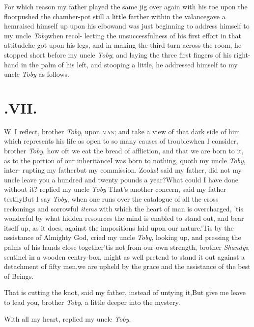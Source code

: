 \documentclass{article}
\begin{document}
For which reason my father played the same jig over again with
his toe upon the floor\tsh pushed the chamber-pot still a
little farther within the valance\tsk gave a hem\tsk raised
himself up upon his elbow\tsk and was just beginning to address
himself to my uncle \textit{Toby}\tsk when recol-
lecting the unsuccessfulness of his first effort in that
attitude\tsk he got upon his legs, and in making the third
turn across the room, he stopped short before my uncle
\textit{Toby}; and laying the three first fingers of his
right-hand in the palm of his left, and stooping a little,
he addressed himself to my uncle \textit{Toby} as follows.

\bigskip
\section{.\enspace VII.}

\lettrine{W}{\,} I reflect, brother \textit{Toby},\break
upon \textsc{man}; and take a view of\break
that dark side of him which represents his life as open to
so many causes of trouble\tsk when I consider, brother
\textit{Toby}, how oft we eat the bread of affliction, and
that we are born to it, as to the portion of our
inheritance\tsk I was born to nothing, quoth my uncle
\textit{Toby}, inter-
rupting my father\tsk but my commission.
Zooks! said my father, did not my uncle leave you a hundred
and twenty pounds a year?\tsh What could I have done without
it? replied my uncle \textit{Toby} \tsh That’s another
concern, said my father testily\tsk But I say \textit{Toby},
when one runs over the catalogue of all the cross reckonings
and sorrowful \textit{items} with which the heart of man is
overcharged, ’tis wonderful by what hidden resources the
mind is enabled to stand out, and bear itself up, as it
does, against the impositions laid upon our nature.\tsh ’Tis
by the assistance of Almighty God, cried my uncle
\textit{Toby}, looking up, and pressing the palms of his
hands close together\tsk ’tis not from our own strength,
brother \textit{Shandy}\tsk a sentinel in a wooden
centry-box, might as well pretend to stand it out against a
detachment of fifty men,\tsk we are upheld by the grace and
the assistance of the best of Beings.

\tsk That is cutting the knot, said my father, instead
of untying it,\tsk But give me leave to lead you, brother
\textit{Toby}, a little deeper into the mystery.

With all my heart, replied my uncle \textit{Toby}.
\end{document}
